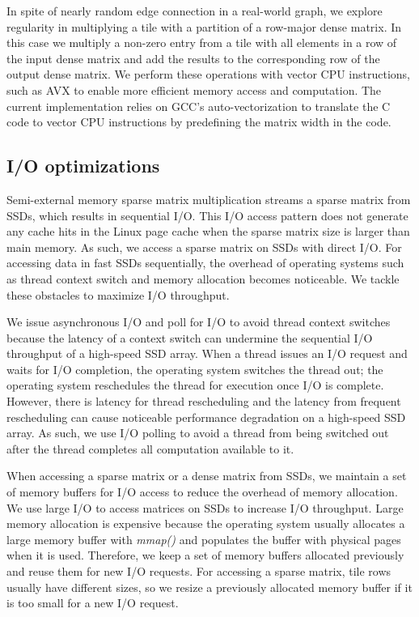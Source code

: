In spite of nearly random edge connection in a real-world graph, we explore
regularity in multiplying a tile with a partition of a row-major dense matrix.
In this case we multiply a non-zero entry from a tile with all elements in
a row of the input dense matrix and add the results to the corresponding row
of the output dense matrix.
We perform these operations with vector CPU instructions, such as
AVX \cite{avx} to enable more efficient memory access and computation.
The current implementation relies on GCC's auto-vectorization
to translate the C code to vector CPU instructions by predefining the matrix
width in the code.

\subsection{I/O optimizations}
Semi-external memory sparse matrix multiplication streams a sparse matrix from
SSDs, which results in sequential I/O. This I/O access pattern does not generate
any cache hits in the Linux page cache when the sparse matrix size is larger
than main memory. As such, we access a sparse matrix on SSDs with direct I/O.
For accessing data in fast SSDs sequentially, the overhead of operating systems
such as thread context switch and memory allocation becomes noticeable.
We tackle these obstacles to maximize I/O throughput.

We issue asynchronous I/O and poll for I/O to avoid thread
context switches because the latency of a context switch can undermine
the sequential I/O throughput of a high-speed SSD array. When a thread issues
an I/O request and waits for I/O completion, the operating system switches
the thread
out; the operating system reschedules the thread for execution once I/O is
complete. However, there is latency for thread rescheduling and the latency
from frequent rescheduling can cause noticeable performance degradation
on a high-speed SSD array. As such, we use I/O polling to avoid a thread from
being switched out after the thread completes all computation available to it.

When accessing a sparse matrix or a dense matrix from SSDs, we maintain a set of
memory buffers for I/O access to reduce the overhead of memory allocation.
We use large I/O to access matrices on SSDs to increase I/O throughput.
Large memory allocation is expensive because the operating
system usually allocates a large memory buffer with \textit{mmap()} and
populates the buffer with physical pages when it is used. Therefore, we keep
a set of memory buffers allocated previously and reuse them for new I/O requests.
For accessing a sparse matrix, tile rows usually have different sizes, so we resize
a previously allocated memory buffer if it is too small for a new I/O request.


